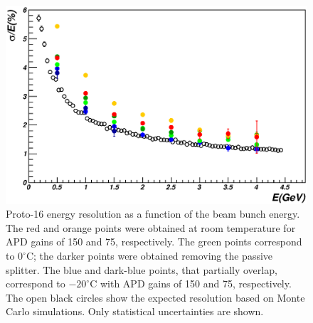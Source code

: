 \begin{figure}
\includegraphics[width=1.0\columnwidth]{./fig/btf_resolution.eps}
\caption{Proto-16 energy resolution as a function of the beam bunch energy. The red and orange points were obtained
  at room temperature for APD gains of 150 and 75, respectively. The green points correspond to $0^\circ$C; the
  darker points were obtained removing the passive splitter. The blue and dark-blue points, that partially overlap, correspond to
  $-20^\circ$C  with APD gains of 150 and 75, respectively. The open black circles show the expected resolution based
  on Monte Carlo simulations. Only statistical uncertainties are shown.}
\label{fig:btf_resolution}
\end{figure} 
